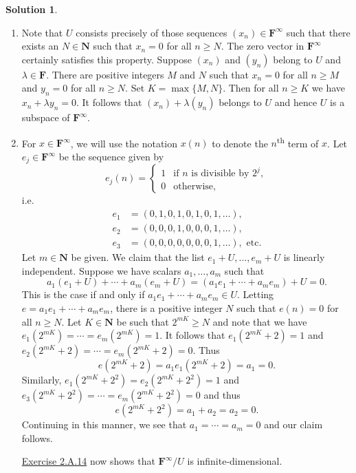 \documentclass[12pt]{article}
\theoremstyle{definition}
\theoremstyle{exercise}
\theoremstyle{solution}
\newtheorem*{solution}{Solution}
\newcommand{\ts}{\textsuperscript}
\newcommand{\N}{\mathbf{N}}
\newcommand{\F}{\mathbf{F}}
\begin{document}
\begin{solution}
    \begin{enumerate}
        \item Note that \( U \) consists precisely of those sequences \( (x_n) \in \F^{\infty} \) such that there exists an \( N \in \N \) such that \( x_n = 0 \) for all \( n \geq N \). The zero vector in \( \F^{\infty} \) certainly satisfies this property. Suppose \( (x_n) \) and \( (y_n) \) belong to \( U \) and \( \lambda \in \F \). There are positive integers \( M \) and \( N \) such that \( x_n = 0 \) for all \( n \geq M \) and \( y_n = 0 \) for all \( n \geq N \). Set \( K = \max \{ M, N \} \). Then for all \( n \geq K \) we have \( x_n + \lambda y_n = 0 \). It follows that \( (x_n) + \lambda (y_n) \) belongs to \( U \) and hence \( U \) is a subspace of \( \F^{\infty} \).

        \item For \( x \in \F^{\infty} \), we will use the notation \( x(n) \) to denote the \( n \)\ts{th} term of \( x \). Let \( e_j \in \F^{\infty} \) be the sequence given by
        \[
            e_j(n) = \begin{cases}
                1 & \text{if } n \text{ is divisible by } 2^j, \\
                0 & \text{otherwise},
            \end{cases}
        \]
        i.e.\
        \begin{align*}
            e_1 &= (0, 1, 0, 1, 0, 1, 0, 1, \ldots), \\
            e_2 &= (0, 0, 0, 1, 0, 0, 0, 1, \ldots), \\
            e_3 &= (0, 0, 0, 0, 0, 0, 0, 1, \ldots), \text{ etc}.
        \end{align*}
        Let \( m \in \N \) be given. We claim that the list \( e_1 + U, \ldots, e_m + U \) is linearly independent. Suppose we have scalars \( a_1, \ldots, a_m \) such that
        \[
            a_1 (e_1 + U) + \cdots + a_m (e_m + U) = (a_1 e_1 + \cdots + a_m e_m) + U = 0.
        \]
        This is the case if and only if \( a_1 e_1 + \cdots + a_m e_m \in U \). Letting \( e = a_1 e_1 + \cdots + a_m e_m \), there is a positive integer \( N \) such that \( e(n) = 0 \) for all \( n \geq N \). Let \( K \in \N \) be such that \( 2^{mK} \geq N \) and note that we have \( e_1(2^{mK}) = \cdots = e_m(2^{mK}) = 1 \). It follows that \( e_1(2^{mK} + 2) = 1 \) and \( e_2(2^{mK} + 2) = \cdots = e_m(2^{mK} + 2) = 0 \). Thus
        \[
            e(2^{mK} + 2) = a_1 e_1(2^{mK} + 2) = a_1 = 0.
        \]
        Similarly, \( e_1(2^{mK} + 2^2) = e_2(2^{mK} + 2^2) = 1 \) and \( e_3(2^{mK} + 2^2) = \cdots = e_m(2^{mK} + 2^2) = 0 \) and thus
        \[
            e(2^{mK} + 2^2) = a_1 + a_2 = a_2 = 0.
        \]
        Continuing in this manner, we see that \( a_1 = \cdots = a_m = 0 \) and our claim follows.

        \href{https://lew98.github.io/Mathematics/LADR_Section_2_A_Exercises.pdf}{Exercise 2.A.14} now shows that \( \F^{\infty} / U \) is infinite-dimensional.
    \end{enumerate}
\end{solution}
\end{document}
